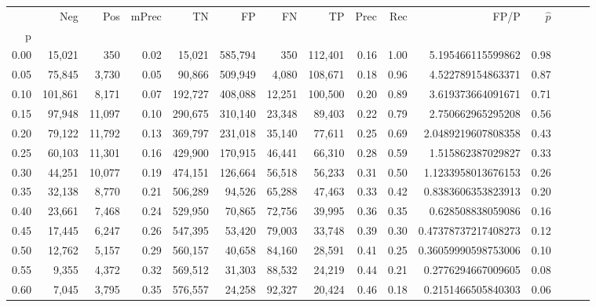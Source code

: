 \begin{tabular}{rrrrrrrrrrrrrrr}
\toprule
{} &      Neg &     Pos & mPrec &       TN &       FP &       FN &       TP &  Prec &   Rec &                  FP/P & $\hat{p}$ \\
p    &          &         &       &          &          &          &          &       &       &                       &           \\
\midrule
0.00 &   15,021 &     350 &  0.02 &   15,021 &  585,794 &      350 &  112,401 &  0.16 &  1.00 &     5.195466115599862 &      0.98 \\
0.05 &   75,845 &   3,730 &  0.05 &   90,866 &  509,949 &    4,080 &  108,671 &  0.18 &  0.96 &     4.522789154863371 &      0.87 \\
0.10 &  101,861 &   8,171 &  0.07 &  192,727 &  408,088 &   12,251 &  100,500 &  0.20 &  0.89 &     3.619373664091671 &      0.71 \\
0.15 &   97,948 &  11,097 &  0.10 &  290,675 &  310,140 &   23,348 &   89,403 &  0.22 &  0.79 &     2.750662965295208 &      0.56 \\
0.20 &   79,122 &  11,792 &  0.13 &  369,797 &  231,018 &   35,140 &   77,611 &  0.25 &  0.69 &    2.0489219607808358 &      0.43 \\
0.25 &   60,103 &  11,301 &  0.16 &  429,900 &  170,915 &   46,441 &   66,310 &  0.28 &  0.59 &     1.515862387029827 &      0.33 \\
0.30 &   44,251 &  10,077 &  0.19 &  474,151 &  126,664 &   56,518 &   56,233 &  0.31 &  0.50 &    1.1233958013676153 &      0.26 \\
0.35 &   32,138 &   8,770 &  0.21 &  506,289 &   94,526 &   65,288 &   47,463 &  0.33 &  0.42 &    0.8383606353823913 &      0.20 \\
0.40 &   23,661 &   7,468 &  0.24 &  529,950 &   70,865 &   72,756 &   39,995 &  0.36 &  0.35 &     0.628508838059086 &      0.16 \\
0.45 &   17,445 &   6,247 &  0.26 &  547,395 &   53,420 &   79,003 &   33,748 &  0.39 &  0.30 &   0.47378737217408273 &      0.12 \\
0.50 &   12,762 &   5,157 &  0.29 &  560,157 &   40,658 &   84,160 &   28,591 &  0.41 &  0.25 &   0.36059990598753006 &      0.10 \\
0.55 &    9,355 &   4,372 &  0.32 &  569,512 &   31,303 &   88,532 &   24,219 &  0.44 &  0.21 &    0.2776294667009605 &      0.08 \\
0.60 &    7,045 &   3,795 &  0.35 &  576,557 &   24,258 &   92,327 &   20,424 &  0.46 &  0.18 &    0.2151466505840303 &      0.06 \\

\end{tabular}
